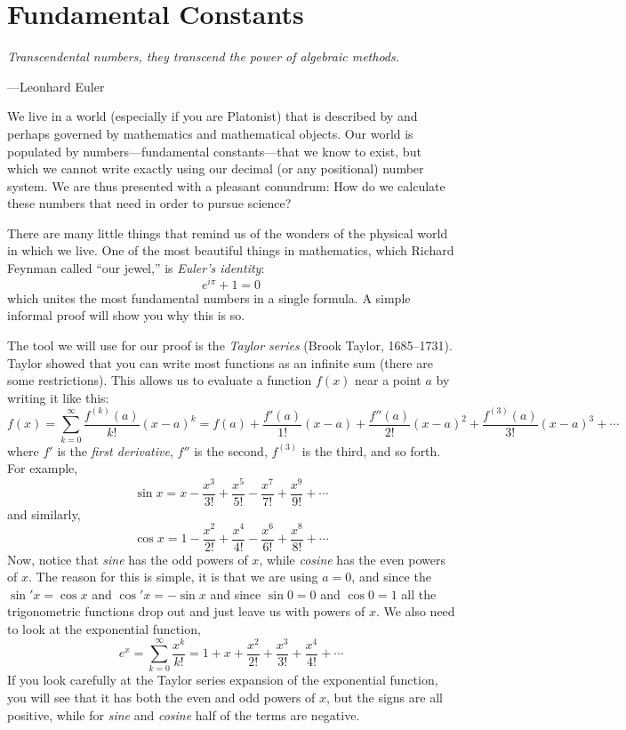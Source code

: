 \section{Fundamental Constants}

\epigraph{\emph{Transcendental numbers, they transcend the power of algebraic methods.}}{---Leonhard Euler}

\noindent
We live in a world (especially if you are Platonist) that is described
by and perhaps governed by mathematics and mathematical objects. Our
world is populated by numbers---fundamental constants---that we know to
exist, but which we cannot write exactly using our decimal (or any
positional) number system. We are thus presented with a pleasant
conundrum: How do we calculate these numbers that need in order to
pursue science?

There are many little things that remind us of the wonders of the
physical world in which we live. One of the most beautiful things in
mathematics, which Richard Feynman called ``our jewel,'' is
\emph{Euler's identity}:
$$
e^{i \pi} + 1 = 0
$$
which unites the most fundamental numbers in a single formula. A simple
informal proof will show you why this is so.

The tool we will use for our proof is the \emph{Taylor series} (Brook
Taylor, 1685--1731). Taylor showed that you can write most functions as
an infinite sum (there are some restrictions). This allows us to
evaluate a function $f(x)$ near a point $a$ by writing it like this:
$$
f(x) = \sum_{k=0}^\infty \frac{f^{(k)}(a)}{k!}(x-a)^k = f(a) +
\frac{f'(a)}{1!}(x-a) + \frac{f''(a)}{2!}(x-a)^2 +
\frac{f^{(3)}(a)}{3!}(x-a)^3 + \cdots
$$
where $f'$ is the \emph{first derivative}, $f''$ is the second,
$f^{(3)}$ is the third, and so forth. For example,
$$
\sin x = x - \frac{x^3}{3!} + \frac{x^5}{5!} - \frac{x^7}{7!} +
\frac{x^9}{9!} + \cdots
$$
and similarly,
$$
\cos x = 1 - \frac{x^2}{2!} + \frac{x^4}{4!} - \frac{x^6}{6!} +
\frac{x^8}{8!} + \cdots
$$
Now, notice that \emph{sine} has the odd powers of $x$, while
\emph{cosine} has the even powers of $x$. The reason for this is simple,
it is that we are using $a = 0$, and since the $\sin ' x = \cos x$ and
$\cos ' x = - \sin x$ and since $\sin 0 = 0$ and $\cos 0 = 1$ all the
trigonometric functions drop out and just leave us with powers of $x$.
We also need to look at the exponential function,
$$
e^x = \sum_{k=0}^\infty \frac{x^k}{k!} = 1 + x + \frac{x^2}{2!} +
\frac{x^3}{3!} + \frac{x^4}{4!} + \cdots
$$
If you look carefully at the Taylor series expansion of the exponential
function, you will see that it has both the even and odd powers of $x$,
but the signs are all positive, while for \emph{sine} and \emph{cosine}
half of the terms are negative.

